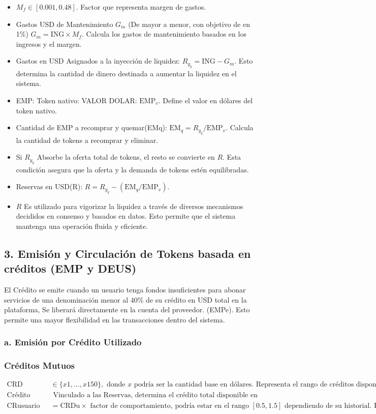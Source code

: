 \documentclass{article}
\begin{document}
\begin{itemize}
    \item \( M_f \in [0.001, 0.48] \). Factor que representa  margen de gastos.
    \item Gastos USD de Mantenimiento \( G_m \) (De mayor a menor, con objetivo de en 1\%) \( G_m = \text{ING} \times M_f \). Calcula los gastos de mantenimiento basados en los ingresos y el margen.
    \item Gastos en USD Asignados a la inyección de liquidez: \( R_y_q = \text{ING} - G_m \). Esto determina la cantidad de dinero destinada a aumentar la liquidez en el sistema.
    \item EMP: Token nativo: VALOR DOLAR: \( \text{EMP}_v \). Define el valor en dólares del token nativo.
    \item Cantidad de EMP a recomprar y quemar(EMq): \( \text{EM}_q = R_y_q / \text{EMP}_v \). Calcula la cantidad de tokens a recomprar y eliminar.
    \item Si \( R_y_q \) Absorbe la oferta total de tokens, el resto se convierte en \( R \). Esta condición asegura que la oferta y la demanda de tokens estén equilibradas.
    \item Reservas en USD(R): \( R = R_y_q - (\text{EM}_q / \text{EMP}_v) \).
    \item \( R \) Es utilizado para vigorizar la liquidez a través de diversos mecanismos decididos en consenso y basados en datos. Esto permite que el sistema mantenga una operación fluida y eficiente.
\end{itemize}


\subsection*{3. Emisión y Circulación de Tokens basada en créditos (EMP y DEUS)}
El Crédito se emite cuando un usuario tenga fondos insuficientes para abonar servicios de una denominación menor al 40\% de su crédito en USD total en la plataforma, Se liberará directamente en la cuenta del proveedor. (EMPe). Esto permite una mayor flexibilidad en las transacciones dentro del sistema.

\subsubsection*{a. Emisión por Crédito Utilizado}
\subsubsection*{Créditos Mutuos}
\begin{align*}
    \text{CRD} & \in \{x1,\ldots,x150\}, \text{ donde } x \text{ podría ser la cantidad base en dólares}. \text{ Representa el rango de créditos disponibles.} \\
    \text{Crédito Total en USD (CRDt):} & \text{ Vinculado a las Reservas, determina el crédito total disponible en el sistema.} \\
    \text{CRusuario} & = \text{CRDu} \times \text{ factor de comportamiento, podría estar en el rango } [0.5, 1.5] \text{ dependiendo de su historial. Esto permite ajustar el crédito según el comportamiento del usuario.}
\end{align*}
\end{document}
